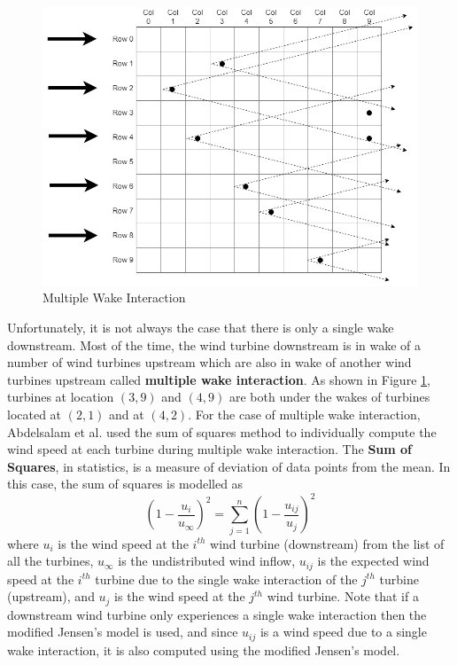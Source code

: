         \begin{figure}[h]
            \centering
            \includegraphics[width=\linewidth]{./Figures/multWake.png}
            \caption{Multiple Wake Interaction \cite{wakemodel}}
            \label{multWake}
        \end{figure}
        
    Unfortunately, it is not always the case that there is only a single wake downstream. Most of the time, the wind turbine downstream is in wake of a number of wind turbines upstream which are also in wake of another wind turbines upstream called \textbf{multiple wake interaction}. As shown in Figure \ref{multWake}, turbines at location $(3,9)$ and $(4,9)$ are both under the wakes of turbines located at $(2,1)$ and at $(4,2)$. For the case of multiple wake interaction, Abdelsalam et al. \cite{this} used the sum of squares method to individually compute the wind speed at each turbine during multiple wake interaction. The \textbf{Sum of Squares}, in statistics, is a measure of deviation of data points from the mean. In this case, the sum of squares is modelled as
        \begin{equation}
            \left(1-\frac{u_i}{u_\infty}\right)^2=\sum_{j=1}^{n}\left(1-\frac{u_{ij}}{u_j}\right)^2
        \end{equation}
    where $u_i$ is the wind speed at the $i^{th}$ wind turbine (downstream) from the list of all the turbines, $u_\infty$ is the undistributed wind inflow, $u_{ij}$ is the expected wind speed at the $i^{th}$ turbine due to the single wake interaction of the $j^{th}$ turbine (upstream), and $u_j$ is the wind speed at the $j^{th}$ wind turbine. Note that if a downstream wind turbine only experiences a single wake interaction then the modified Jensen's model is used, and since $u_{ij}$ is a wind speed due to a single wake interaction, it is also computed using the modified Jensen's model.
    
